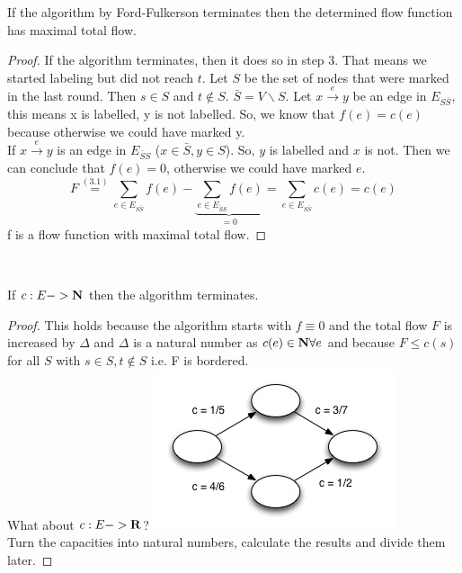 \begin{lemma}
If the algorithm by Ford-Fulkerson terminates then the determined flow function has maximal total flow.
\end{lemma}

\begin{proof}
If the algorithm terminates, then it does so in step 3. That means we started labeling but did not reach $t$. Let $S$ be the set of nodes that were marked in the last round. Then $s \in S$ and $t \notin S$. $\bar{S} = V \backslash S$. Let $x \xrightarrow{e} y$ be an edge in $E_{S\bar{S}}$, this means x is labelled, y is not labelled. So, we know that $f(e) = c(e)$ because otherwise we could have marked y.\\
If $x \xrightarrow{e} y$ is an edge in $E_{\bar{S}S}$ ($x \in \bar{S}, y \in S$). So, $y$ is labelled and $x$ is not. Then we can conclude that $f(e) = 0$, otherwise we could have marked $e$. 
\[F \stackrel{(3.1)}{=} \sum_{e \in E_{S\bar{S}}}f(e) - \underbrace{ \sum_{e \in E_{\bar{S}S}}f(e)}_{= 0} = \sum_{e \in E_{S\bar{S}}} c(e) = c(e) \]
f is a flow function with maximal total flow. 
\end{proof}

 \\

\begin{lemma}
If $c: E -> \textbf{N}$ then the algorithm terminates.
\end{lemma}

\begin{proof}
This holds because the algorithm starts with $f \equiv 0$ and the total flow $F$ is increased by $\Delta$ and $\Delta$ is a natural number as $c(e) \in \textbf{N} \forall e$ and because $F \le c(s)$ for all $S$ with $s \in S, t \notin S$ i.e. F is bordered. \\
What about $c: E -> \textbf{R}$? 
\includegraphics{diagrams/Chapter3_Proof_3_6.jpg} \\
Turn the capacities into natural numbers, calculate the results and divide them later.
\end{proof}

